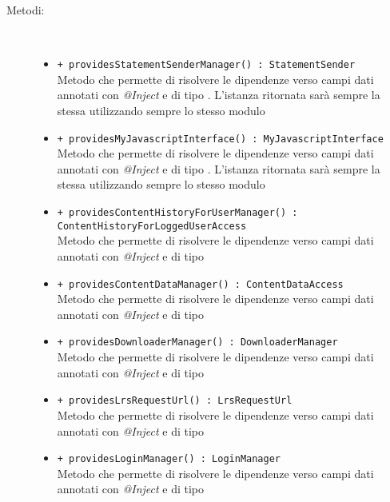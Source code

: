 \documentclass[../Tesi.tex]{subfiles}
\begin{document}
		\begin{description}
			\item[Metodi:] \
			\begin{itemize}
				\item \texttt{+ providesStatementSenderManager() : StatementSender}\\
				Metodo che permette di risolvere le dipendenze verso campi dati annotati con \textit{@Inject} e di tipo . L'istanza ritornata sarà sempre la stessa utilizzando sempre lo stesso modulo
				
				\item \texttt{+ providesMyJavascriptInterface() : MyJavascriptInterface}\\
				Metodo che permette di risolvere le dipendenze verso campi dati annotati con \textit{@Inject} e di tipo . L'istanza ritornata sarà sempre la stessa utilizzando sempre lo stesso modulo

				\item \texttt{+ providesContentHistoryForUserManager() :\\ ContentHistoryForLoggedUserAccess}\\
				Metodo che permette di risolvere le dipendenze verso campi dati annotati con \textit{@Inject} e di tipo 

				\item \texttt{+ providesContentDataManager() : ContentDataAccess}\\
				Metodo che permette di risolvere le dipendenze verso campi dati annotati con \textit{@Inject} e di tipo 

				\item \texttt{+ providesDownloaderManager() : DownloaderManager}\\
				Metodo che permette di risolvere le dipendenze verso campi dati annotati con \textit{@Inject} e di tipo 

				\item \texttt{+ providesLrsRequestUrl() : LrsRequestUrl}\\
				Metodo che permette di risolvere le dipendenze verso campi dati annotati con \textit{@Inject} e di tipo 

				\item \texttt{+ providesLoginManager() : LoginManager}\\
				Metodo che permette di risolvere le dipendenze verso campi dati annotati con \textit{@Inject} e di tipo 


\end{itemize}
\end{description}
\end{document}
